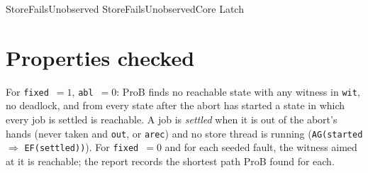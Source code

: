 \documentclass[a4paper,10pt,fleqn]{article}
\newcommand{\field}[1]{\texttt{#1}}
\begin{document}
\begin{zed}
StoreFailsUnobserved  StoreFailsUnobservedCore \land Latch
\end{zed}


\section{Properties checked}
\label{sec:props}

For \field{fixed}~$=1$, \field{abl}~$=0$: ProB finds no reachable state with any
witness in \field{wit}, no deadlock, and from every state after the abort has
started a state in which every job is settled is reachable. A job is
\emph{settled} when it is out of the abort's hands (never taken and
\field{out}, or \field{arec}) and no store thread is running
(\field{AG(started} $\Rightarrow$ \field{EF(settled))}). For \field{fixed}~$=0$ and
for each seeded fault, the witness aimed at it is reachable; the report records the
shortest path ProB found for each.
\end{document}
